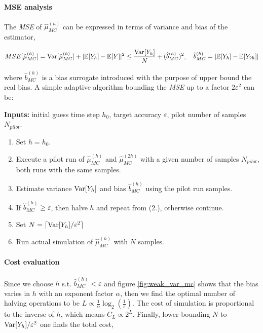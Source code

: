 \paragraph{MSE analysis}
The \textit{MSE} of $\hat{\mu}_{MC}^{(h)}$ can be expressed in terms of variance and bias of the estimator,

\begin{equation}
MSE[\hat{\mu}_{MC}^{(h)}] = \text{Var}[\hat{\mu}_{MC}^{(h)}] + |\mathbb{E}[Y_h] - \mathbb{E}[Y]|^2 \le \frac{\text{Var}[Y_h]}{N} + (\hat{b}_{MC}^{(h)})^2, \quad \hat{b}_{MC}^{(h)} = |\mathbb{E}[Y_h] - \mathbb{E}[Y_{2h}]|
\end{equation}

where $\hat{b}_{MC}^{(h)}$ is a bias surrogate introduced with the purpose of upper bound the real bias.
A simple adaptive algorithm bounding the \textit{MSE} up to a factor $2\varepsilon^2$ can be:

\textbf{Inputs: } initial guess time step $h_0$, target accuracy $\varepsilon$, pilot number of samples $N_{pilot}$.

\begin{enumerate}
\item Set $h = h_0$.
\item Execute a pilot run of $\hat{\mu}_{MC}^{(h)}$ and $\hat{\mu}_{MC}^{(2h)}$ with a given number of samples $N_{pilot}$, both runs with the same samples. 
\item Estimate variance $\text{Var}[Y_h]$ and bias $\hat{b}_{MC}^{(h)}$ using the pilot run samples.
\item If $\hat{b}_{MC}^{(h)} \ge \varepsilon$, then halve $h$ and repeat from (2.), otherwise continue.
\item Set $N = \lceil \text{Var}[Y_h] / \varepsilon^2 \rceil$
\item Run actual simulation of $\hat{\mu}_{MC}^{(h)}$ with $N$ samples.
\end{enumerate}

\paragraph{Cost evaluation}
Since we choose $h$ s.t. $\hat{b}_{MC}^{(h)} < \varepsilon$ and figure \ref{fig:weak_var_mc} shows that the bias varies in $h$ with an exponent factor $\alpha$, then we find the optimal number of halving operations to be $L \propto \frac{1}{\alpha} \log_2(\frac{1}{\varepsilon})$. The cost of simulation is proportional to the inverse of $h$, which means $C_L \propto 2^L$. Finally, lower bounding $N$ to $\text{Var}[Y_h] / \varepsilon^2$ one finds the total cost,

